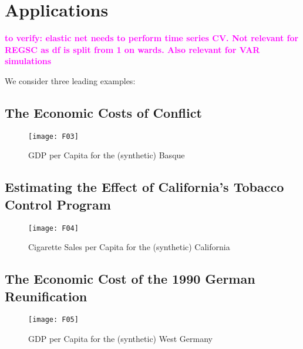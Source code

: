 \section{Applications}

\textcolor{magenta}{\textbf{to verify: elastic net needs to perform time series CV. Not relevant for REGSC as df is split  from 1 on wards. Also relevant for VAR simulations}}
 
We consider three leading examples:


\subsection{The Economic Costs of Conflict}
\cite{abadie:2003}
\begin{figure}[H]
	\centering
	\texttt{[image: F03]}
	\caption{GDP per Capita for the (synthetic) Basque}
	\label{F_03}
\end{figure}

\newpage
\subsection{Estimating the Effect of California’s Tobacco Control Program}
\cite{abadie:2010}
\begin{figure}[H]
	\centering
	\texttt{[image: F04]}
	\caption{Cigarette Sales per Capita for the (synthetic) California}
	\label{F_04}
\end{figure}

\newpage
\subsection{The Economic Cost of the 1990 German Reunification}
\cite{abadie:2015}
\begin{figure}[H]
	\centering
	\texttt{[image: F05]}
	\caption{GDP per Capita for the (synthetic) West Germany}
	\label{F_05}
\end{figure}